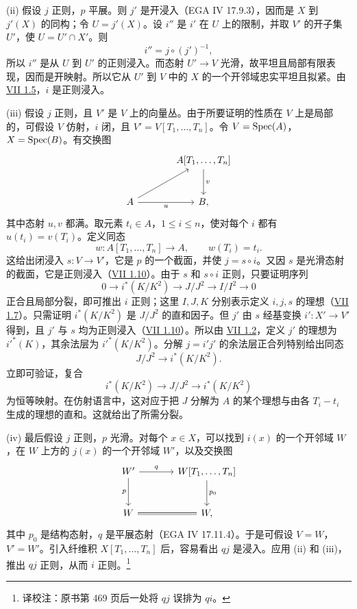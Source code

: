 (ii) 假设 $j$ 正则，$p$ 平展。则 $j'$ 是开浸入（EGA IV 17.9.3），因而是 $X$ 到 $j'(X)$ 的同构；令 $U=j'(X)$。设 $i''$ 是 $i'$ 在 $U$ 上的限制，并取 $V'$ 的开子集 $U'$，使 $U=U'\cap X'$。则
\[
i''=j\circ(j')^{-1},
\]
所以 $i''$ 是从 $U$ 到 $U'$ 的正则浸入。而态射 $U'\to V$ 光滑，故平坦且局部有限表现，因而是开映射。所以它从 $U'$ 到 $V$ 中的 $X$ 的一个开邻域忠实平坦且拟紧。由 \hyperlink{sga6.e07.prop.1-5}{VII 1.5}，$i$ 是正则浸入。

(iii) 假设 $j$ 正则，且 $V'$ 是 $V$ 上的向量丛。由于所要证明的性质在 $V$ 上是局部的，可假设 $V$ 仿射，$i$ 闭，且 $V'=V[T_1,\ldots,T_n]$。令 $V=\operatorname{Spec}(A)$，$X=\operatorname{Spec}(B)$。有交换图
\[
\begin{tikzcd}[column sep=large,row sep=large]
& A[T_1,\ldots,T_n] \arrow[d,"v"]\\
A \arrow[r,"u"'] \arrow[ur] & B,
\end{tikzcd}
\]
其中态射 $u,v$ 都满。取元素 $t_i\in A$，$1\leq i\leq n$，使对每个 $i$ 都有 $u(t_i)=v(T_i)$。定义同态
\[
w:A[T_1,\ldots,T_n]\longrightarrow A,
\qquad w(T_i)=t_i.
\]
这给出闭浸入 $s:V\to V'$，它是 $p$ 的一个截面，并使 $j=s\circ i$。又因 $s$ 是光滑态射的截面，它是正则浸入（\hyperlink{sga6.e07.prop.1-10}{VII 1.10}）。由于 $s$ 和 $s\circ i$ 正则，只要证明序列
\[
0\longrightarrow i^*(K/K^2)\longrightarrow J/J^2\longrightarrow I/I^2\longrightarrow 0
\]
正合且局部分裂，即可推出 $i$ 正则；这里 $I,J,K$ 分别表示定义 $i,j,s$ 的理想（\hyperlink{sga6.e07.prop.1-7}{VII 1.7}）。只需证明 $i^*(K/K^2)$ 是 $J/J^2$ 的直和因子。但 $j'$ 由 $s$ 经基变换 $i':X'\to V'$ 得到，且 $j'$ 与 $s$ 均为正则浸入（\hyperlink{sga6.e07.prop.1-10}{VII 1.10}）。所以由 \hyperlink{sga6.e07.lem.1-2}{VII 1.2}，定义 $j'$ 的理想为 $i'^*(K)$，其余法层为 $i'^*(K/K^2)$。分解 $j=i'j'$ 的余法层正合列特别给出同态
\[
J/J^2\longrightarrow i^*(K/K^2).
\]
立即可验证，复合
\[
i^*(K/K^2)\longrightarrow J/J^2\longrightarrow i^*(K/K^2)
\]
为恒等映射。在仿射语言中，这对应于把 $J$ 分解为 $A$ 的某个理想与由各 $T_i-t_i$ 生成的理想的直和。这就给出了所需分裂。

(iv) 最后假设 $j$ 正则，$p$ 光滑。对每个 $x\in X$，可以找到 $i(x)$ 的一个开邻域 $W$，在 $W$ 上方的 $j(x)$ 的一个开邻域 $W'$，以及交换图
\[
\begin{tikzcd}[column sep=large,row sep=large]
W' \arrow[r,"q"] \arrow[d,"p"'] & W[T_1,\ldots,T_n] \arrow[d,"p_0"]\\
W \arrow[r,equal] & W,
\end{tikzcd}
\]
其中 $p_0$ 是结构态射，$q$ 是平展态射（EGA IV 17.11.4）。于是可假设 $V=W$，$V'=W'$。引入纤维积 $X[T_1,\ldots,T_n]$ 后，容易看出 $qj$ 是浸入。应用 (ii) 和 (iii)，推出 $qj$ 正则，从而 $i$ 正则。\footnote{译校注：原书第 469 页后一处将 $qj$ 误排为 $qi$。}

